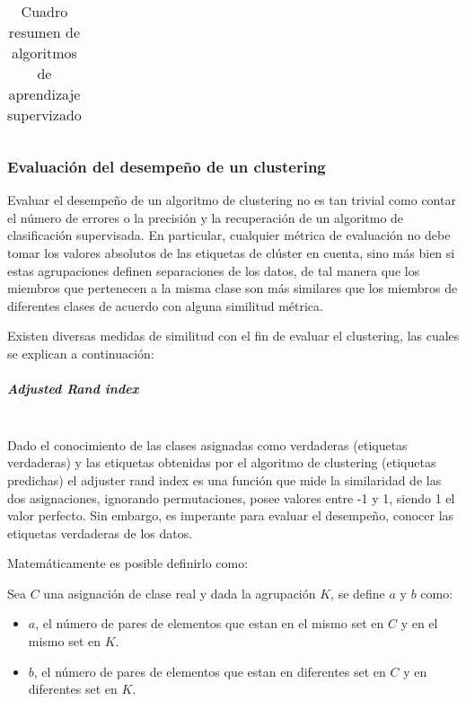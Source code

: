 \begin{table}[]
\begin{tabular}{|l|l|l|l|l|}
	\end{tabular}
	
	
	\caption{Cuadro resumen de algoritmos de aprendizaje supervizado}
	\label{cuadroResumen}
\end{table}

\subsubsection{Evaluación del desempeño de un clustering}\label{evaluacion}

Evaluar el desempeño de un algoritmo de clustering no es tan trivial como contar el número de errores o la precisión y la recuperación de un algoritmo de clasificación supervisada. En particular, cualquier métrica de evaluación no debe tomar los valores absolutos de las etiquetas de clúster en cuenta, sino más bien si estas agrupaciones definen separaciones de los datos, de tal manera que los miembros que pertenecen a la misma clase son más similares que los miembros de diferentes clases de acuerdo con alguna similitud métrica.

Existen diversas medidas de similitud con el fin de evaluar el clustering, las cuales se explican a continuación:

\subparagraph{Adjusted Rand index\\\\}

Dado el conocimiento de las clases asignadas como verdaderas (etiquetas verdaderas) y las etiquetas obtenidas por el algoritmo de clustering (etiquetas predichas) el adjuster rand index es una función que mide la similaridad de las dos asignaciones, ignorando permutaciones, posee valores entre -1 y 1, siendo 1 el valor perfecto. Sin embargo, es imperante para evaluar el desempeño, conocer las etiquetas verdaderas de los datos.

Matemáticamente es posible definirlo como:

Sea $C$ una asignación de clase real y dada la agrupación $K$, se define $a$ y $b$ como:

\begin{itemize}
	
	\item $a$, el número de pares de elementos que estan en el mismo set en $C$ y en el mismo set en $K$.
	\item $b$, el número de pares de elementos que estan en diferentes set en $C$ y en diferentes set en $K$.
\end{itemize}

